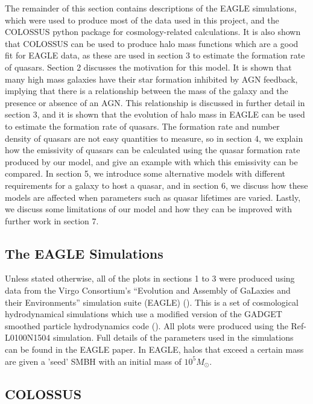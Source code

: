 \documentclass[12pt]{article}%
\begin{document}
The remainder of this section contains descriptions of the EAGLE simulations, which were used to produce most of the data used in this project, and the COLOSSUS python package for cosmology-related calculations. It is also shown that COLOSSUS can be used to produce halo mass functions which are a good fit for EAGLE data, as these are used in section 3 to estimate the formation rate of quasars. Section 2 discusses the motivation for this model. It is shown that many high mass galaxies have their star formation inhibited by AGN feedback, implying that there is a relationship between the mass of the galaxy and the presence or absence of an AGN. This relationship is discussed in further detail in section 3, and it is shown that the evolution of halo mass in EAGLE can be used to estimate the formation rate of quasars. The formation rate and number density of quasars are not easy quantities to measure, so in section 4, we explain how the emissivity of quasars can be calculated using the quasar formation rate produced by our model, and give an example with which this emissivity can be compared. In section 5, we introduce some alternative models with different requirements for a galaxy to host a quasar, and in section 6, we discuss how these models are affected when parameters such as quasar lifetimes are varied. Lastly, we discuss some limitations of our model and how they can be improved with further work in section 7.

\subsection{The EAGLE Simulations}

Unless stated otherwise, all of the plots in sections 1 to 3 were produced using data from the Virgo Consortium’s “Evolution and Assembly of GaLaxies and their Environments” simulation suite (EAGLE) (\cite{EAGLE}). This is a set of cosmological hydrodynamical simulations which use a modified version of the GADGET smoothed particle hydrodynamics code (\cite{GADGET}). All plots were produced using the Ref-L0100N1504 simulation. Full details of the parameters used in the simulations can be found in the EAGLE paper. In EAGLE, halos that exceed a certain mass are given a 'seed' SMBH with an initial mass of $10^5M_\odot$.

\subsection{COLOSSUS}
\end{document}
